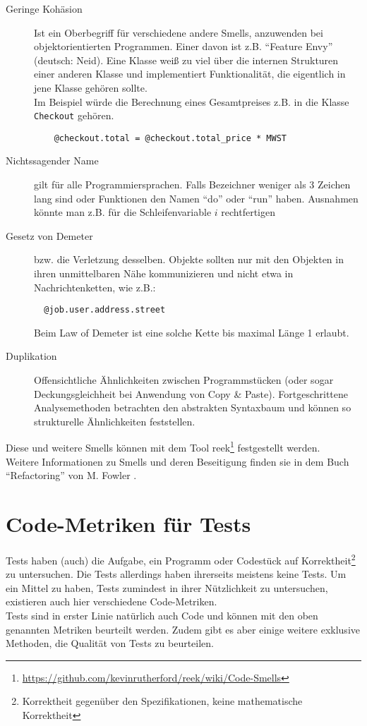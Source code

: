 \begin{description}
 \item[Geringe Kohäsion] Ist ein Oberbegriff für verschiedene andere Smells, anzuwenden bei objektorientierten Programmen. Einer davon ist z.B. "`Feature Envy"' (deutsch: Neid). Eine Klasse weiß zu viel über die internen Strukturen einer anderen Klasse und implementiert Funktionalität, die eigentlich in jene Klasse gehören sollte. \\
 Im Beispiel würde die Berechnung eines Gesamtpreises z.B. in die Klasse \texttt{Checkout} gehören.
 \begin{lstlisting}
    @checkout.total = @checkout.total_price * MWST
 \end{lstlisting}
 \item[Nichtssagender Name] gilt für alle Programmiersprachen. Falls Bezeichner weniger als 3 Zeichen lang sind oder Funktionen den Namen "`do"' oder "`run"' haben. Ausnahmen könnte man z.B. für die Schleifenvariable $i$ rechtfertigen
 \item[Gesetz von Demeter] bzw. die Verletzung desselben. Objekte sollten nur mit den Objekten in ihren unmittelbaren Nähe kommunizieren und nicht etwa in Nachrichtenketten, wie z.B.:
 \begin{lstlisting}
  @job.user.address.street
 \end{lstlisting}
 Beim Law of Demeter ist eine solche Kette bis maximal Länge 1 erlaubt.
 \item[Duplikation] Offensichtliche Ähnlichkeiten zwischen Programmstücken (oder sogar Deckungsgleichheit bei Anwendung von Copy \& Paste). Fortgeschrittene Analysemethoden betrachten den abstrakten Syntaxbaum und können so strukturelle Ähnlichkeiten feststellen.
 \end{description}

Diese und weitere Smells können mit dem Tool reek\footnote{\url{https://github.com/kevinrutherford/reek/wiki/Code-Smells}} festgestellt werden.\\
Weitere Informationen zu Smells und deren Beseitigung finden sie in dem Buch "`Refactoring"' von M. Fowler \citep{fowler_refactoring_1999}.

\section{Code-Metriken für Tests}
\label{sec:metrics}
Tests haben (auch) die Aufgabe, ein Programm oder Codestück auf Korrektheit\footnote{Korrektheit gegenüber den Spezifikationen, keine mathematische Korrektheit} zu untersuchen. Die Tests allerdings haben ihrerseits meistens keine Tests. Um ein Mittel zu haben, Tests zumindest in ihrer Nützlichkeit zu untersuchen, existieren auch hier verschiedene Code-Metriken.\\
Tests sind in erster Linie natürlich auch Code und können mit den oben genannten Metriken beurteilt werden. Zudem gibt es aber einige weitere exklusive Methoden, die Qualität von Tests zu beurteilen.

